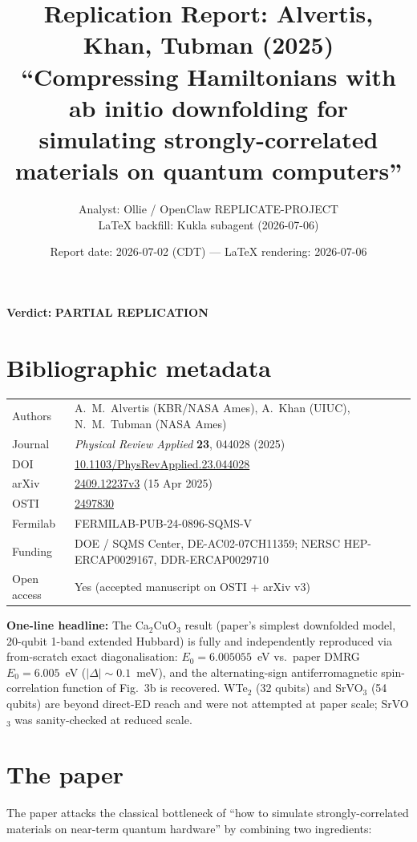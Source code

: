 \documentclass[11pt]{article}
\title{Replication Report: Alvertis, Khan, Tubman (2025)\\
\large ``Compressing Hamiltonians with ab initio downfolding for simulating strongly-correlated materials on quantum computers''}
\author{Analyst: Ollie / OpenClaw REPLICATE-PROJECT\\
LaTeX backfill: Kukla subagent (2026-07-06)}
\date{Report date: 2026-07-02 (CDT) --- \LaTeX{} rendering: 2026-07-06}
\begin{document}
\maketitle

\begin{center}
\textbf{Verdict:} \textbf{PARTIAL REPLICATION}
\end{center}

\section*{Bibliographic metadata}

\begin{tabular}{ll}
\toprule
Authors & A.\ M.\ Alvertis (KBR/NASA Ames), A.\ Khan (UIUC), N.\ M.\ Tubman (NASA Ames) \\
Journal & \emph{Physical Review Applied} \textbf{23}, 044028 (2025) \\
DOI & \href{https://doi.org/10.1103/PhysRevApplied.23.044028}{10.1103/PhysRevApplied.23.044028} \\
arXiv & \href{https://arxiv.org/abs/2409.12237}{2409.12237v3} (15 Apr 2025) \\
OSTI & \href{https://www.osti.gov/biblio/2497830}{2497830} \\
Fermilab & FERMILAB-PUB-24-0896-SQMS-V \\
Funding & DOE / SQMS Center, DE-AC02-07CH11359; NERSC HEP-ERCAP0029167, DDR-ERCAP0029710 \\
Open access & Yes (accepted manuscript on OSTI + arXiv v3) \\
\bottomrule
\end{tabular}

\bigskip
\noindent \textbf{One-line headline:} The Ca$_2$CuO$_3$ result (paper's simplest downfolded model, 20-qubit 1-band extended Hubbard) is fully and independently reproduced via from-scratch exact diagonalisation: $E_0 = 6.005055$~eV vs.\ paper DMRG $E_0 = 6.005$~eV ($|\Delta| \sim 0.1$~meV), and the alternating-sign antiferromagnetic spin-correlation function of Fig.~3b is recovered. WTe$_2$ (32 qubits) and SrVO$_3$ (54 qubits) are beyond direct-ED reach and were not attempted at paper scale; SrVO$_3$ was sanity-checked at reduced scale.

\section{The paper}

The paper attacks the classical bottleneck of ``how to simulate strongly-correlated materials on near-term quantum hardware'' by combining two ingredients:
\end{document}
